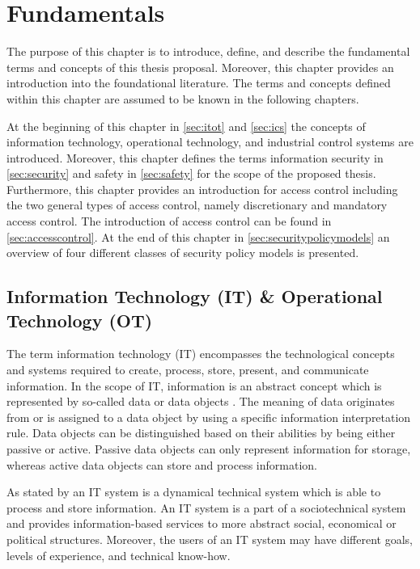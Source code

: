 \chapter{Fundamentals}
\label{ch:fundamentals}
The purpose of this chapter is to introduce, define, and describe the fundamental terms and concepts of this thesis proposal.
Moreover, this chapter provides an introduction into the foundational literature.
The terms and concepts defined within this chapter are assumed to be known in the following chapters. 

At the beginning of this chapter in \autoref{sec:itot} and \autoref{sec:ics} the concepts of information technology, operational technology, and industrial control systems are introduced.
Moreover, this chapter defines the terms information security in \autoref{sec:security} and safety in \autoref{sec:safety} for the scope of the proposed thesis.
Furthermore, this chapter provides an introduction for access control including the two general types of access control, namely discretionary and mandatory access control.
The introduction of access control can be found in \autoref{sec:accesscontrol}.
At the end of this chapter in \autoref{sec:securitypolicymodels} an overview of four different classes of security policy models is presented.

\section{Information Technology (IT) \& Operational Technology (OT)}
\label{sec:itot}
The term information technology (IT) encompasses the technological concepts and systems required to create, process, store, present, and communicate information.
In the scope of IT, information is an abstract concept which is represented by so-called data or data objects \cite{Eckert2023}.
The meaning of data originates from or is assigned to a data object by using a specific information interpretation rule.
Data objects can be distinguished based on their abilities by being either passive or active.
Passive data objects can only represent information for storage, whereas active data objects can store and process information.

As stated by \citeauthor{Eckert2023} \cite{Eckert2023} an IT system is a dynamical technical system which is able to process and store information.
An IT system is a part of a sociotechnical system and provides information-based services to more abstract social, economical or political structures.
Moreover, the users of an IT system may have different goals, levels of experience, and technical know-how.

